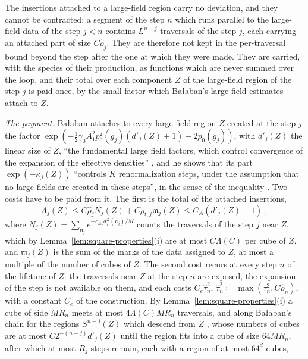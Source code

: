 \documentclass[11pt]{preprint}
\numberwithin{equation}{section}
\theoremstyle{definition}
\theoremstyle{remark}
\theoremstyle{plain}
\begin{document}
The insertions attached to a large-field region carry no deviation, and they cannot be contracted: a segment of the step $n$ which runs parallel to the large-field data of the step $j < n$ contains $L^{n-j}$ traversals of the step $j$, each carrying an attached part of size $C\hat\rho_j$. They are therefore not kept in the per-traversal bound beyond the step after the one at which they were made. They are carried, with the species of their production, as functions which are never summed over the loop, and their total over each component $Z$ of the large-field region of the step $j$ is paid once, by the small factor which Ba{\l}aban's large-field estimates attach to $Z$.

\emph{The payment.} Ba{\l}aban attaches to every large-field region $Z$ created at the step $j$ the factor $\exp(-\frac12\gamma_0A_1^2p_0^2(g_j)(d'_j(Z) + 1) - 2p_0(g_j))$, with $d'_j(Z)$ the linear size of $Z$, ``the fundamental large field factors, which control convergence of the expansion of the effective densities'' \cite[p.~381]{BalabanLFR2}, and he shows that its part $\exp(-\kappa_j(Z))$ ``controls $K$ renormalization steps, under the assumption that no large fields are created in these steps'', in the sense of the inequality \cite[(1.80), p.~384]{BalabanLFR2}. Two costs have to be paid from it. The first is the total of the attached insertions,
\begin{equation}\label{eq:attached-total}
    A_j(Z) \leq C\hat\rho_jN_j(Z) + C\rho_{t,j}\mathfrak m_j(Z) \leq C_A(d'_j(Z) + 1)\;,
\end{equation}
where $N_j(Z) = \sum_{\mathfrak n_j}e^{-c_{\mathrm{att}}d^Z_j(\mathfrak n_j)/M}$ counts the traversals of the step $j$ near $Z$, which by Lemma~\ref{lem:square-properties}(i) are at most $C\Lambda(C)$ per cube of $Z$, and $\mathfrak m_j(Z)$ is the sum of the marks of the data assigned to $Z$, at most a multiple of the number of cubes of $Z$. The second cost recurs at every step $n$ of the lifetime of $Z$: the traversals near $Z$ at the step $n$ are exposed, the expansion of the step is not available on them, and each costs $C_e\hat\tau_n^2$, $\hat\tau_n^2 \coloneqq \max(\tau_n^2, C\hat\rho_n)$, with a constant $C_e$ of the construction. By Lemma~\ref{lem:square-properties}(i) a cube of side $MR_n$ meets at most $4\Lambda(C)MR_n$ traversals, and along Ba{\l}aban's chain for the regions $S^{n-j}(Z)$ which descend from $Z$ \cite[pp.~384--385]{BalabanLFR2}, whose numbers of cubes are at most $C2^{-(n-j)}d'_j(Z)$ until the region fits into a cube of size $64MR_n$, after which at most $R_j$ steps remain, each with a region of at most $64^d$ cubes,
\end{document}
